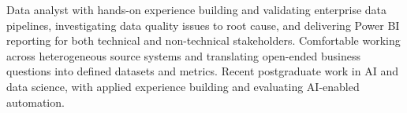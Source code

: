 Data analyst with hands-on experience building and validating enterprise data pipelines, investigating data quality issues to root cause, and delivering Power BI reporting for both technical and non-technical stakeholders. Comfortable working across heterogeneous source systems and translating open-ended business questions into defined datasets and metrics. Recent postgraduate work in AI and data science, with applied experience building and evaluating AI-enabled automation.